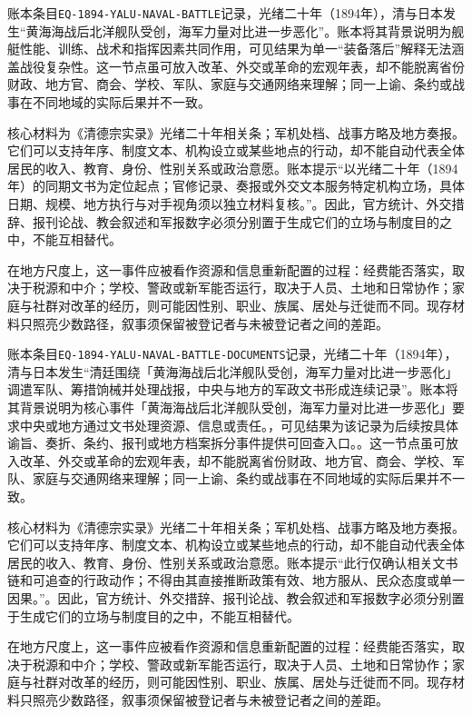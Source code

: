 账本条目\texttt{EQ-1894-YALU-NAVAL-BATTLE}记录，光绪二十年（1894年），清与日本发生“黄海海战后北洋舰队受创，海军力量对比进一步恶化”。账本将其背景说明为舰艇性能、训练、战术和指挥因素共同作用，可见结果为单一“装备落后”解释无法涵盖战役复杂性。这一节点虽可放入改革、外交或革命的宏观年表，却不能脱离省份财政、地方官、商会、学校、军队、家庭与交通网络来理解；同一上谕、条约或战事在不同地域的实际后果并不一致。

核心材料为《清德宗实录》光绪二十年相关条；军机处档、战事方略及地方奏报。它们可以支持年序、制度文本、机构设立或某些地点的行动，却不能自动代表全体居民的收入、教育、身份、性别关系或政治意愿。账本提示“以光绪二十年（1894年）的同期文书为定位起点；官修记录、奏报或外交文本服务特定机构立场，具体日期、规模、地方执行与对手视角须以独立材料复核。”。因此，官方统计、外交措辞、报刊论战、教会叙述和军报数字必须分别置于生成它们的立场与制度目的之中，不能互相替代。

在地方尺度上，这一事件应被看作资源和信息重新配置的过程：经费能否落实，取决于税源和中介；学校、警政或新军能否运行，取决于人员、土地和日常协作；家庭与社群对改革的经历，则可能因性别、职业、族属、居处与迁徙而不同。现存材料只照亮少数路径，叙事须保留被登记者与未被登记者之间的差距。

账本条目\texttt{EQ-1894-YALU-NAVAL-BATTLE-DOCUMENTS}记录，光绪二十年（1894年），清与日本发生“清廷围绕「黄海海战后北洋舰队受创，海军力量对比进一步恶化」调遣军队、筹措饷械并处理战报，中央与地方的军政文书形成连续记录”。账本将其背景说明为核心事件「黄海海战后北洋舰队受创，海军力量对比进一步恶化」要求中央或地方通过文书处理资源、信息或责任。，可见结果为该记录为后续按具体谕旨、奏折、条约、报刊或地方档案拆分事件提供可回查入口。。这一节点虽可放入改革、外交或革命的宏观年表，却不能脱离省份财政、地方官、商会、学校、军队、家庭与交通网络来理解；同一上谕、条约或战事在不同地域的实际后果并不一致。

核心材料为《清德宗实录》光绪二十年相关条；军机处档、战事方略及地方奏报。它们可以支持年序、制度文本、机构设立或某些地点的行动，却不能自动代表全体居民的收入、教育、身份、性别关系或政治意愿。账本提示“此行仅确认相关文书链和可追查的行政动作；不得由其直接推断政策有效、地方服从、民众态度或单一因果。”。因此，官方统计、外交措辞、报刊论战、教会叙述和军报数字必须分别置于生成它们的立场与制度目的之中，不能互相替代。

在地方尺度上，这一事件应被看作资源和信息重新配置的过程：经费能否落实，取决于税源和中介；学校、警政或新军能否运行，取决于人员、土地和日常协作；家庭与社群对改革的经历，则可能因性别、职业、族属、居处与迁徙而不同。现存材料只照亮少数路径，叙事须保留被登记者与未被登记者之间的差距。

